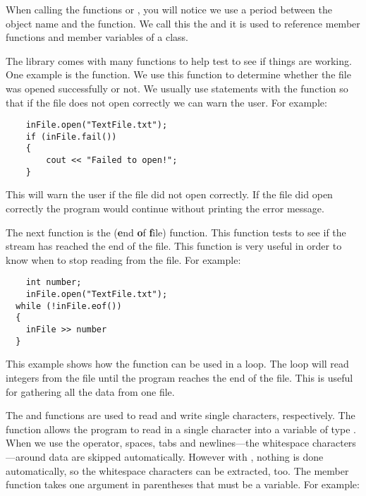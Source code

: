 When calling the functions  or , you will notice we use a period between the object name and the function. 
We call this the  and it is used to reference member functions and member variables of a class. 


The  library comes with many functions to help test to see if things are working. 
One example is the  function. 
We use this function to determine whether the file was opened successfully or not. 
We usually use  statements with the function so that if the file does not open correctly we can warn the user. 
For example:

\begin{lstlisting}
	inFile.open("TextFile.txt");
	if (inFile.fail())
	{ 
		cout << "Failed to open!";
	}
\end{lstlisting}

This will warn the user if the file did not open correctly. 
If the file did open correctly the program would continue without printing the error message.

The next function is the  (\textbf{e}nd \textbf{o}f \textbf{f}ile) function. 
This function tests to see if the stream has reached the end of the file. 
This function is very useful in order to know when to stop reading from the file. 
For example:

\begin{lstlisting}
	int number;
	inFile.open("TextFile.txt");
  while (!inFile.eof())
  {
    inFile >> number
  }
\end{lstlisting}

This example shows how the  function can be used in a  loop. 
The  loop will read integers from the file until the program reaches the end of the file. 
This is useful for gathering all the data from one file. 

The  and  functions are used to read and write single characters, respectively. 
The function  allows the program to read in a single character into a variable of type . 
When we use the \Code{>>} operator, spaces, tabs and newlines---the whitespace characters---around data are skipped automatically. 
However with , nothing is done automatically, so the whitespace characters can be extracted, too. 
The member function  takes one argument in parentheses that must be a  variable. 
For example:

